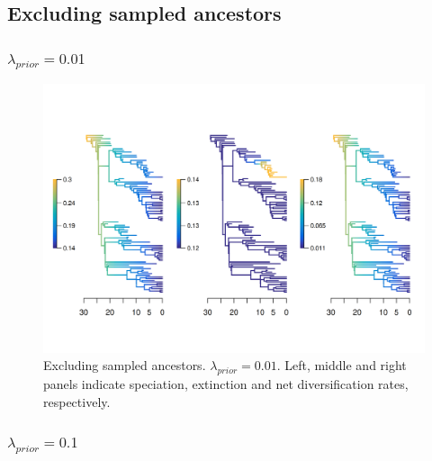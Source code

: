 \documentclass[a4paper, 12pt]{article}
\begin{document}
\subsection{Excluding sampled ancestors}

\subsubsection{$\lambda_{prior} = 0.01$}

\begin{figure}[H]
  \centering
  \includegraphics[width = \linewidth]{figures/diversification/sensitivity-analyses/shifts-0-01/sensitivity-analysis-noanc-0-01.png}
  \caption{Excluding sampled ancestors. $\lambda_{prior} = 0.01$. Left, middle and right panels indicate speciation, extinction and net diversification rates, respectively.}
  \label{fig-noanc-0-01}
\end{figure}

\subsubsection{$\lambda_{prior} = 0.1$}
\end{document}
